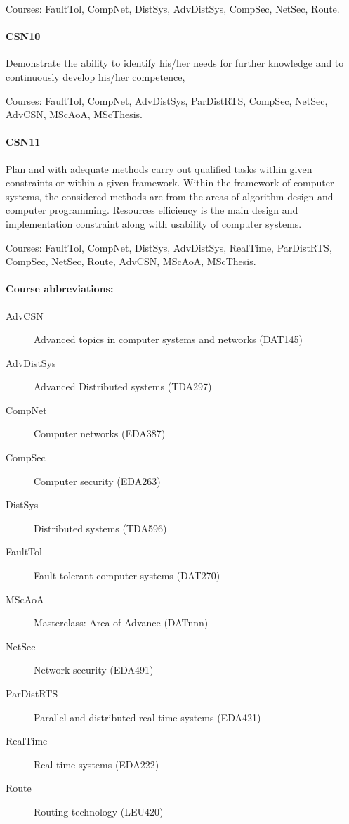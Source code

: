 Courses: FaultTol, CompNet, DistSys, AdvDistSys, CompSec, NetSec,
Route.

\paragraph{CSN10} Demonstrate the ability to identify his/her needs
for further knowledge and to continuously develop his/her competence,

Courses: FaultTol, CompNet, AdvDistSys, ParDistRTS, CompSec, NetSec,
AdvCSN, MScAoA, MScThesis.

\paragraph{CSN11} Plan and with adequate methods carry out qualified
tasks within given constraints or within a given framework. Within the
framework of computer systems, the considered methods are from the
areas of algorithm design and computer programming. Resources
efficiency is the main design and implementation constraint along with
usability of computer systems.

Courses: FaultTol, CompNet, DistSys, AdvDistSys, RealTime,
ParDistRTS, CompSec, NetSec, Route, AdvCSN, MScAoA, MScThesis.

\paragraph{Course abbreviations:}
\begin{description}
\item[AdvCSN    ] Advanced topics in computer systems and networks  (DAT145)
\item[AdvDistSys] Advanced Distributed systems                      (TDA297)
\item[CompNet   ] Computer networks                                 (EDA387)
\item[CompSec   ] Computer security                                 (EDA263)
\item[DistSys   ] Distributed systems                               (TDA596)
\item[FaultTol  ] Fault tolerant computer systems                   (DAT270)
\item[MScAoA    ] Masterclass: Area of Advance                      (DATnnn)
\item[NetSec    ] Network security                                  (EDA491)
\item[ParDistRTS] Parallel and distributed real-time systems        (EDA421)
\item[RealTime  ] Real time systems                                 (EDA222)
\item[Route     ] Routing technology                                (LEU420)
\end{description}

